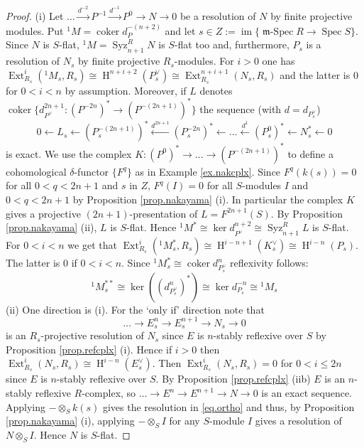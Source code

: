 \documentclass[a4paper,10pt]{amsart}
\theoremstyle{plain}
\theoremstyle{definition}
\theoremstyle{remark}
\numberwithin{equation}{xx}
\DeclareMathOperator{\coker}{coker}
\DeclareMathOperator{\Ext}{Ext}
\DeclareMathOperator{\cH}{H}
\DeclareMathOperator{\im}{im}
\DeclareMathOperator{\mSpec}{\fr{m}-Spec}
\DeclareMathOperator{\Spec}{Spec}
\DeclareMathOperator{\Syz}{Syz}
\newcommand{\co}{\colon}
\newcommand{\ra}{\rightarrow}
\newcommand{\la}{\leftarrow}
\newcommand{\lra}{\longrightarrow}
\newcommand{\ot}{{\otimes}}
\renewcommand{\leq}{\leqslant}
\newcommand{\fr}[1]{\mathfrak{{#1}}}
\newcommand{\xla}[1]{\xleftarrow{{#1}}}
\newcommand{\xra}[1]{\xrightarrow{{#1}}}
\newcommand{\xt}[4]{{\Ext} _{#2}^{#1}({#3},{#4})}
\newcommand{\syz}[2]{{\Syz}_{#2}^{#1}}
\begin{document}
\begin{proof}
(i) Let \(\dots\xra{d^{-2}} P^{-1}\xra{d^{-1}} P^{0}\ra N\ra 0\) be a resolution of \(N\) by finite projective modules. Put \({}^{1\!}M=\coker d_{P}^{-(n+2)}\) and let \(s\in Z:=\im\{\mSpec R\ra \Spec S\}\).  Since \(N\) is \(S\)-flat, \({}^{1\!}M=\syz{R}{n+1}N\) is \(S\)-flat too and, furthermore, \(P_{s}\) is a resolution of \(N_{s}\) by finite projective \(R_{s}\)-modules. For \(i>0\) one has \(\xt{i}{R_{s}}{{}^{1\!}M_{s}}{R_{s}}\cong\cH^{n+i+2}(P^{\vee}_{s})\cong \xt{n{+}i{+}1}{R_{s}}{N_{s}}{R_{s}}\) and the latter is \(0\) for \(0<i<n\) by assumption. Moreover, if \(L\) denotes \(\coker\{d_{P^{\vee}}^{2n+1}\co(P^{-2n})^{*}\ra (P^{-(2n{+}1)})^{*}\}\) the sequence (with \(d=d_{P_{s}^{\vee}}\))
\begin{equation}
0\la L_{s}\la (P_{s}^{-(2n{+}1)})^{*}\xla{d^{2n{+}1}}(P_{s}^{-2n})^{*}\la\dots \xla{d^{1}}(P_{s}^{0})^{*}\la N_{s}^{*}\la 0
\end{equation}
is exact. We use the complex \(K\co(P^{0})^{*}\ra\dots\ra (P^{-(2n+1)})^{*}\) to define a cohomological \(\delta\)-functor \(\{F^{q}\}\) as in Example \ref{ex.nakcplx}. Since \(F^{q}(k(s))=0\) for all \(0<q<2n+1\) and \(s\) in \(Z\), \(F^{q}(I)=0\) for all \(S\)-modules \(I\) and \(0<q<2n+1\) by Proposition \ref{prop.nakayama} (i). In particular the complex \(K\) gives a projective \((2n+1)\)-presentation of \(L=F^{2n+1}(S)\). By Proposition \ref{prop.nakayama} (ii), \(L\) is \(S\)-flat. Hence \({}^{1\!}M^{*}\cong \ker d_{P^{\vee}}^{n+2}\cong\syz{R}{n{+}1}L\) is \(S\)-flat. 
For \(0<i<n\) we get that \(\xt{i}{R_{s}}{{}^{1\!}M_{s}^{*}}{R_{s}}\cong\cH^{i-n+1}(K_{s}^{\vee})\cong\cH^{i-n}(P_{s})\). The latter is \(0\) if \(0<i<n\).
Since \({}^{1\!}M_{s}^{*}\cong\coker d_{P_{s}^{\vee}}^{n}\) reflexivity follows: 
\begin{equation}
{}^{1\!}M_{s}^{**}\cong \ker ((d_{P_{s}^{\vee}}^{n})^{*})\cong \ker d_{P_{s}}^{-n}\cong {}^{1\!}M_{s}
\end{equation}
(ii) One direction is (i). For the `only if' direction
note that 
\begin{equation}\label{eq.ortho}
\dots\lra E^{n}_{s}\lra E^{n+1}_{s}\lra N_{s}\ra 0
\end{equation}
is an \(R_{s}\)-projective resolution of \(N_{s}\) since \(E\) is \(n\)-stably reflexive over \(S\) by Proposition \ref{prop.refcplx} (i). Hence if \(i>0\) then \(\xt{i}{R_{s}}{N_{s}}{R_{s}}\cong\cH^{i-n}(E_{s}^{\vee})\). Then \(\xt{i}{R_{s}}{N_{s}}{R_{s}}=0\) for \(0<i\leq 2n\) since \(E\) is \(n\)-stably reflexive over \(S\). By Proposition \ref{prop.refcplx} (iib) \(E\) is an \(n\)-stably reflexive \(R\)-complex, so \(\dots\ra E^{n}\ra E^{n+1}\ra N\ra 0\) is an exact sequence. Applying \(-\ot_{S}k(s)\) gives the resolution in \eqref{eq.ortho} and thus, by Proposition \ref{prop.nakayama} (i), applying \(-\ot_{S}I\) for any \(S\)-module \(I\) gives a resolution of \(N\ot_{S}I\). Hence \(N\) is \(S\)-flat. 


\end{proof}
\end{document}

